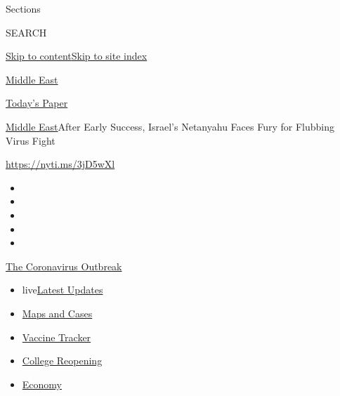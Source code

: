 Sections

SEARCH

\protect\hyperlink{site-content}{Skip to
content}\protect\hyperlink{site-index}{Skip to site index}

\href{https://www.nytimes3xbfgragh.onion/section/world/middleeast}{Middle
East}

\href{https://myaccount.nytimes3xbfgragh.onion/auth/login?response_type=cookie\&client_id=vi}{}

\href{https://www.nytimes3xbfgragh.onion/section/todayspaper}{Today's
Paper}

\href{/section/world/middleeast}{Middle East}\textbar{}After Early
Success, Israel's Netanyahu Faces Fury for Flubbing Virus Fight

\url{https://nyti.ms/3jD5wXl}

\begin{itemize}
\item
\item
\item
\item
\item
\end{itemize}

\href{https://www.nytimes3xbfgragh.onion/news-event/coronavirus?action=click\&pgtype=Article\&state=default\&region=TOP_BANNER\&context=storylines_menu}{The
Coronavirus Outbreak}

\begin{itemize}
\tightlist
\item
  live\href{https://www.nytimes3xbfgragh.onion/2020/08/04/world/coronavirus-covid-19.html?action=click\&pgtype=Article\&state=default\&region=TOP_BANNER\&context=storylines_menu}{Latest
  Updates}
\item
  \href{https://www.nytimes3xbfgragh.onion/interactive/2020/us/coronavirus-us-cases.html?action=click\&pgtype=Article\&state=default\&region=TOP_BANNER\&context=storylines_menu}{Maps
  and Cases}
\item
  \href{https://www.nytimes3xbfgragh.onion/interactive/2020/science/coronavirus-vaccine-tracker.html?action=click\&pgtype=Article\&state=default\&region=TOP_BANNER\&context=storylines_menu}{Vaccine
  Tracker}
\item
  \href{https://www.nytimes3xbfgragh.onion/2020/08/02/us/covid-college-reopening.html?action=click\&pgtype=Article\&state=default\&region=TOP_BANNER\&context=storylines_menu}{College
  Reopening}
\item
  \href{https://www.nytimes3xbfgragh.onion/live/2020/08/03/business/stock-market-today-coronavirus?action=click\&pgtype=Article\&state=default\&region=TOP_BANNER\&context=storylines_menu}{Economy}
\end{itemize}

